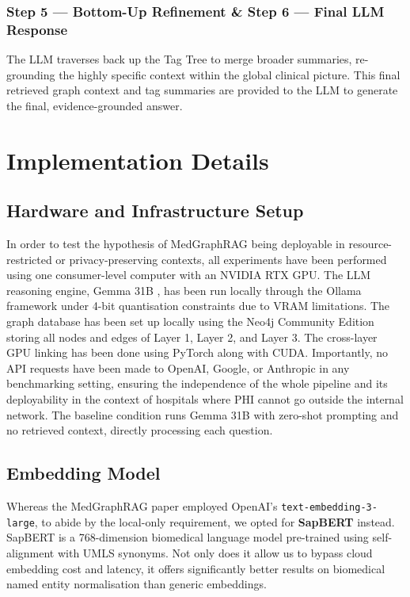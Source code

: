 \documentclass[a4paper,fleqn]{cas-sc}
\begin{document}
\subsubsection{Step 5 --- Bottom-Up Refinement \& Step 6 --- Final LLM Response}
The LLM traverses back up the Tag Tree to merge broader summaries, re-grounding the highly specific context within the global clinical picture. This final retrieved graph context and tag summaries are provided to the LLM to generate the final, evidence-grounded answer.

\section{Implementation Details}

\subsection{Hardware and Infrastructure Setup}
In order to test the hypothesis of MedGraphRAG being deployable in resource-restricted or privacy-preserving contexts, all experiments have been performed using one consumer-level computer with an NVIDIA RTX GPU. The LLM reasoning engine, Gemma 31B \cite{gemma2024}, has been run locally through the Ollama framework \cite{ollama2024} under 4-bit quantisation constraints due to VRAM limitations. The graph database has been set up locally using the Neo4j Community Edition \cite{neo4j} storing all nodes and edges of Layer 1, Layer 2, and Layer 3. The cross-layer GPU linking has been done using PyTorch \cite{pytorch2019} along with CUDA. Importantly, no API requests have been made to OpenAI, Google, or Anthropic in any benchmarking setting, ensuring the independence of the whole pipeline and its deployability in the context of hospitals where PHI cannot go outside the internal network. The baseline condition runs Gemma 31B with zero-shot prompting and no retrieved context, directly processing each question.

\subsection{Embedding Model}
Whereas the MedGraphRAG paper \cite{wu2024medgraphrag} employed OpenAI's \texttt{text-embedding-3-large}, to abide by the local-only requirement, we opted for \textbf{SapBERT} \cite{liu2021sapbert} instead. SapBERT is a 768-dimension biomedical language model pre-trained using self-alignment with UMLS synonyms. Not only does it allow us to bypass cloud embedding cost and latency, it offers significantly better results on biomedical named entity normalisation than generic embeddings.
\end{document}
